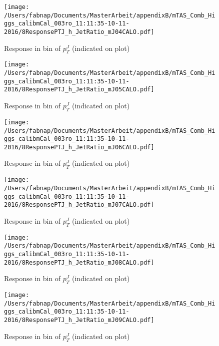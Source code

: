 \begin{figure}

\texttt{[image: /Users/fabnap/Documents/MasterArbeit/appendixB/mTAS\_Comb\_Higgs\_calibmCal\_003ro\_11:11:35-10-11-2016/8ResponsePTJ\_h\_JetRatio\_mJ04CALO.pdf]}
\caption{Response in bin of  $p_{T}^{J}$ (indicated on plot)} 

\end{figure}

\begin{figure}

\texttt{[image: /Users/fabnap/Documents/MasterArbeit/appendixB/mTAS\_Comb\_Higgs\_calibmCal\_003ro\_11:11:35-10-11-2016/8ResponsePTJ\_h\_JetRatio\_mJ05CALO.pdf]}
\caption{Response in bin of  $p_{T}^{J}$ (indicated on plot)} 

\end{figure}

\begin{figure}

\texttt{[image: /Users/fabnap/Documents/MasterArbeit/appendixB/mTAS\_Comb\_Higgs\_calibmCal\_003ro\_11:11:35-10-11-2016/8ResponsePTJ\_h\_JetRatio\_mJ06CALO.pdf]}
\caption{Response in bin of  $p_{T}^{J}$ (indicated on plot)} 

\end{figure}

%
\begin{figure}

\texttt{[image: /Users/fabnap/Documents/MasterArbeit/appendixB/mTAS\_Comb\_Higgs\_calibmCal\_003ro\_11:11:35-10-11-2016/8ResponsePTJ\_h\_JetRatio\_mJ07CALO.pdf]}
\caption{Response in bin of  $p_{T}^{J}$ (indicated on plot)} 

\end{figure}


\begin{figure}

\texttt{[image: /Users/fabnap/Documents/MasterArbeit/appendixB/mTAS\_Comb\_Higgs\_calibmCal\_003ro\_11:11:35-10-11-2016/8ResponsePTJ\_h\_JetRatio\_mJ08CALO.pdf]}
\caption{Response in bin of  $p_{T}^{J}$ (indicated on plot)} 

\end{figure}

\begin{figure}

\texttt{[image: /Users/fabnap/Documents/MasterArbeit/appendixB/mTAS\_Comb\_Higgs\_calibmCal\_003ro\_11:11:35-10-11-2016/8ResponsePTJ\_h\_JetRatio\_mJ09CALO.pdf]}
\caption{Response in bin of  $p_{T}^{J}$ (indicated on plot)} 

\end{figure}

